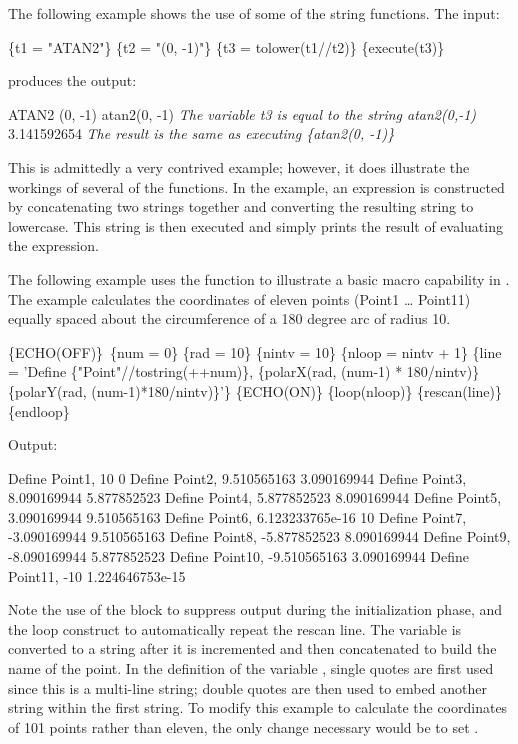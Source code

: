 The following example shows the use of some of the string functions. The input:
\begin{apinp}
\{t1 = "ATAN2"\} 
\{t2 = "(0, -1)"\} 
\{t3 = tolower(t1//t2)\} 
\{execute(t3)\} 
\end{apinp}
produces the output:
\begin{apout}
ATAN2 
(0, -1)
atan2(0, -1)   \textit{The variable t3 is equal to the string atan2(0,-1)} 
3.141592654    \textit{The result is the same as executing \{atan2(0, -1)\}}
\end{apout}

This is admittedly a very contrived example; however, it does
illustrate the workings of several of the functions. In the example,
an expression is constructed by concatenating two strings together and
converting the resulting string to lowercase.  This string is then
executed and simply prints the result of evaluating the expression.

The following example uses the  function to illustrate a basic
macro capability in \aprepro{}. The example calculates the coordinates
of eleven points (Point1 \ldots{} Point11) equally spaced about the
circumference of a 180 degree arc of radius 10.

\begin{apinp}
\{ECHO(OFF)\}\
\{num = 0\} 
\{rad = 10\} 
\{nintv = 10\} 
\{nloop = nintv + 1\} 
\{line = 'Define \{"Point"//tostring(++num)\}, \{polarX(rad, (num-1) * 
  180/nintv)\} \{polarY(rad, (num-1)*180/nintv)\}'\}
\{ECHO(ON)\} 
\{loop(nloop)\}
\{rescan(line)\} 
\{endloop\}
\end{apinp}

Output:

\begin{apout}
Define  Point1,  10    0
Define  Point2,  9.510565163    3.090169944
Define  Point3,  8.090169944    5.877852523
Define  Point4,  5.877852523    8.090169944
Define  Point5,  3.090169944    9.510565163
Define  Point6,  6.123233765e-16    10
Define  Point7,  -3.090169944    9.510565163
Define  Point8,  -5.877852523    8.090169944
Define  Point9,  -8.090169944    5.877852523
Define  Point10,  -9.510565163    3.090169944
Define  Point11,  -10    1.224646753e-15
\end{apout}

Note the use of the  block to 
suppress output during the initialization phase, and the loop construct
to automatically repeat the rescan line. The variable \cmd{num} is converted 
to a string after it is incremented and then concatenated to build the name of 
the point. In the definition of the variable \cmd{line}, single quotes are first 
used since this is a multi-line string; double quotes are then used to embed another 
string within the first string. To modify this example to calculate the coordinates 
of 101 points rather than eleven, the only change necessary would be to set .

